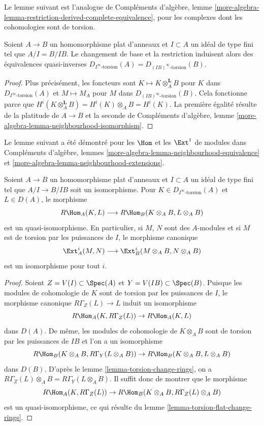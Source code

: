\noindent
Le lemme suivant est l'analogue de Compléments d'algèbre, lemme \ref{more-algebra-lemma-restriction-derived-complete-equivalence},
pour les complexes dont les cohomologies sont de torsion.

\begin{lemma}
\label{lemma-torsion-flat-change-rings}
Soient $A \to B$ un homomorphisme plat d'anneaux et $I \subset A$ un idéal de type fini
tel que $A/I = B/IB$. Le changement de base et la restriction induisent alors
des équivalences quasi-inverses
$D_{I^\infty\text{-torsion}}(A) = D_{(IB)^\infty\text{-torsion}}(B)$.
\end{lemma}

\begin{proof}
Plus précisément, les foncteurs sont $K \mapsto K \otimes_A^\mathbf{L} B$
pour $K$ dans $D_{I^\infty\text{-torsion}}(A)$ et $M \mapsto M_A$
pour $M$ dans $D_{(IB)^\infty\text{-torsion}}(B)$. Cela fonctionne parce que $H^i(K \otimes_A^\mathbf{L} B) = H^i(K) \otimes_A B = H^i(K)$.
La première égalité résulte de la platitude de $A \to B$ et la seconde
de Compléments d'algèbre, lemme \ref{more-algebra-lemma-neighbourhood-isomorphism}.
\end{proof}

\noindent
Le lemme suivant a été démontré pour les $\Hom$ et les $\Ext^1$ de modules
dans Compléments d'algèbre, lemmes \ref{more-algebra-lemma-neighbourhood-equivalence} et \ref{more-algebra-lemma-neighbourhood-extensions}.

\begin{lemma}
\label{lemma-neighbourhood-extensions}
Soient $A \to B$ un homomorphisme plat d'anneaux et $I \subset A$
un idéal de type fini tel que $A/I \to B/IB$ soit un isomorphisme.
Pour $K \in D_{I^\infty\text{-torsion}}(A)$ et $L \in D(A)$, le morphisme
$$
R\Hom_A(K, L) \longrightarrow R\Hom_B(K \otimes_A B, L \otimes_A B)
$$
est un quasi-isomorphisme. En particulier, si $M$, $N$
sont des $A$-modules et si $M$ est de torsion par les puissances de $I$,
le morphisme canonique
$$
\Ext^i_A(M, N)
\longrightarrow
\Ext^i_B(M \otimes_A B, N \otimes_A B)
$$
est un isomorphisme pour tout $i$.
\end{lemma}

\begin{proof}
Soient $Z = V(I) \subset \Spec(A)$ et $Y = V(IB) \subset \Spec(B)$.
Puisque les modules de cohomologie de $K$ sont de torsion par les puissances
de $I$, le morphisme canonique $R\Gamma_Z(L) \to L$ induit un isomorphisme
$$
R\Hom_A(K, R\Gamma_Z(L)) \to R\Hom_A(K, L)
$$
dans $D(A)$. De même, les modules de cohomologie de $K \otimes_A B$
sont de torsion par les puissances de $IB$ et l'on a un isomorphisme
$$
R\Hom_B(K \otimes_A B, R\Gamma_Y(L \otimes_A B)) \to 
R\Hom_B(K \otimes_A B, L \otimes_A B)
$$
dans $D(B)$.
D'après le lemme \ref{lemma-torsion-change-rings}, on a $R\Gamma_Z(L) \otimes_A B = R\Gamma_Y(L \otimes_A B)$.
Il suffit donc de montrer que le morphisme
$$
R\Hom_A(K, R\Gamma_Z(L)) \to R\Hom_B(K \otimes_A B, R\Gamma_Z(L) \otimes_A B)
$$
est un quasi-isomorphisme, ce qui résulte du lemme \ref{lemma-torsion-flat-change-rings}.
\end{proof}




